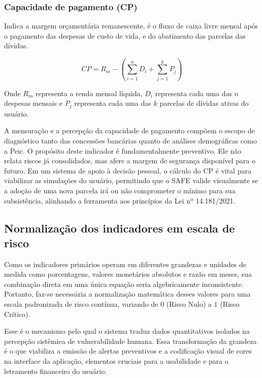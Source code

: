 \documentclass[portuguese]{sbc2025}%
\begin{document}
\subsubsection{Capacidade de pagamento (CP)}

Indica a margem orçamentária remanescente, é o fluxo de caixa livre mensal após o pagamento das despesas de custo de vida, e do abatimento das parcelas das dívidas.

\begin{equation}\label{equ4}
    CP = R_m - \left( \sum_{i=1}^{n} D_i + \sum_{j=1}^{k} P_j \right)
\end{equation}

Onde $R_m$ representa a renda mensal líquida, $D_i$ representa cada uma das $n$ despesas mensais e $P_j$ representa cada uma das $k$ parcelas de dívidas ativas do usuário.

A mensuração e a percepção da capacidade de pagamento compõem o escopo de diagnóstico tanto das concessões bancárias quanto de análises demográficas como a Peic. O propósito deste indicador é fundamentalmente preventivo. Ele não relata riscos já consolidados, mas afere a margem de segurança disponível para o futuro. Em um sistema de apoio à decisão pessoal, o cálculo do CP é vital para viabilizar as simulações do usuário, permitindo que o SAFE valide visualmente se a adoção de uma nova parcela irá ou não comprometer o mínimo para sua subsistência, alinhando a ferramenta aos princípios da Lei nº 14.181/2021.

\subsection{Normalização dos indicadores em escala de risco}

Como os indicadores primários operam em diferentes grandezas e unidades de medida como porcentagens, valores monetários absolutos e razão em meses, sua combinação direta em uma única equação seria algebricamente inconsistente. Portanto, faz-se necessária a normalização matemática desses valores para uma escala padronizada de risco contínua, variando de $0$ (Risco Nulo) a $1$ (Risco Crítico).

Esse é o mecanismo pelo qual o sistema traduz dados quantitativos isolados na percepção sistêmica de vulnerabilidade humana. Essa transformação da grandeza é o que viabiliza a emissão de alertas preventivos e a codificação visual de cores na interface da aplicação, elementos cruciais para a usabilidade e para o letramento financeiro do usuário.
\end{document}
